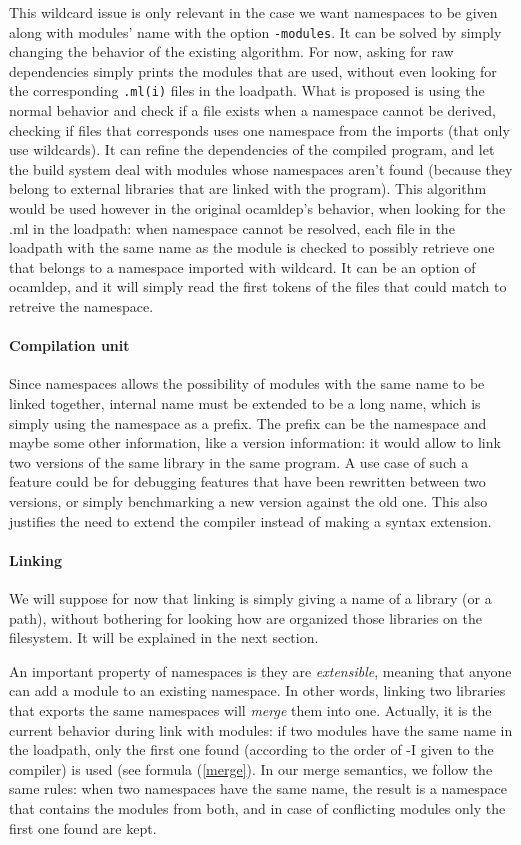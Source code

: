 This wildcard issue is only relevant in the case we want namespaces to be given
along with modules' name with the option \texttt{-modules}. It can be solved by
simply changing the behavior of the existing algorithm. For now, asking for raw
dependencies simply prints the modules that are used, without even looking for
the corresponding \texttt{.ml(i)} files in the loadpath. What is proposed is
using the normal behavior and check if a file exists when a namespace cannot be
derived, checking if files that corresponds uses one namespace from the imports
(that only use wildcards). It can refine the dependencies of the compiled
program, and let the build system deal with modules whose namespaces aren't
found (because they belong to external libraries that are linked with the
program). This algorithm would be used however in the original ocamldep's
behavior, when looking for the .ml in the loadpath: when namespace cannot be
resolved, each file in the loadpath with the same name as the module is checked
to possibly retrieve one that belongs to a namespace imported with wildcard. It
can be an option of ocamldep, and it will simply read the first tokens of the
files that could match to retreive the namespace.


\paragraph{Compilation unit}

Since namespaces allows the possibility of modules with the same name to be
linked together, internal name must be extended to be a long name, which is
simply using the namespace as a prefix. The prefix can be the namespace and
maybe some other information, like a version information: it would allow to link
two versions of the same library in the same program. A use case of such a
feature could be for debugging features that have been rewritten between two
versions, or simply benchmarking a new version against the old one. This also
justifies the need to extend the compiler instead of making a syntax extension.


\paragraph{Linking} We will suppose for now that linking is simply giving a name
of a library (or a path), without bothering for looking how are organized those
libraries on the filesystem. It will be explained in the next section.

An important property of namespaces is they are \emph{extensible}, meaning that
anyone can add a module to an existing namespace. In other words, linking two
libraries that exports the same namespaces will \emph{merge} them into
one. Actually, it is the current behavior during link with modules: if two
modules have the same name in the loadpath, only the first one found (according
to the order of -I given to the compiler) is used (see formula (\ref{merge}). In
our merge semantics, we follow the same rules: when two namespaces have the same
name, the result is a namespace that contains the modules from both, and in case
of conflicting modules only the first one found are kept.

